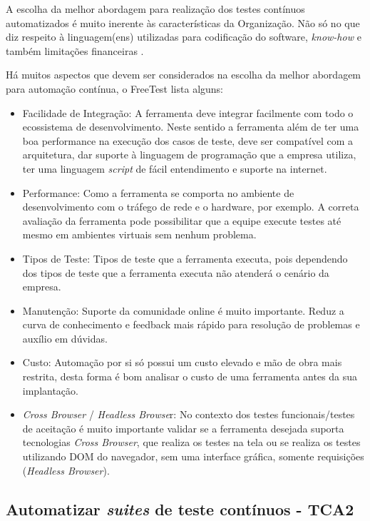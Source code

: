 A escolha da melhor abordagem para realização dos testes contínuos automatizados é muito inerente às características da Organização. Não só no que diz respeito à linguagem(ens) utilizadas para codificação do software, \textit{know-how} e também limitações financeiras \cite{Castelo2015}.

Há muitos aspectos que devem ser considerados na escolha da melhor abordagem para automação contínua, o FreeTest lista alguns:

\begin{itemize}
	\item Facilidade de Integração: A ferramenta deve integrar facilmente com todo o ecossistema de desenvolvimento. Neste sentido a ferramenta além de ter uma boa performance na execução dos casos de teste, deve ser compatível com a arquitetura, dar suporte à linguagem de programação que a empresa utiliza, ter uma linguagem \textit{script} de fácil entendimento e suporte na internet.
	\item Performance: Como a ferramenta se comporta no ambiente de desenvolvimento com o tráfego de rede e o hardware, por exemplo. A correta avaliação da ferramenta pode possibilitar que a equipe execute testes até mesmo em ambientes virtuais sem nenhum problema.
	\item Tipos de Teste: Tipos de teste que a ferramenta executa, pois dependendo dos tipos de teste que a ferramenta executa não atenderá o cenário da empresa.
	\item Manutenção: Suporte da comunidade online é muito importante. Reduz a curva de conhecimento e feedback mais rápido para resolução de problemas e auxílio em dúvidas.
	\item Custo: Automação por si só possui um custo elevado e mão de obra mais restrita, desta forma é bom analisar o custo de uma ferramenta antes da sua implantação.
	\item \textit{Cross Browser} / \textit{Headless Browse}r: No contexto dos testes funcionais/testes de aceitação é muito importante validar se a ferramenta desejada suporta tecnologias \textit{Cross Browser}, que realiza os testes na tela ou se realiza os testes utilizando DOM do navegador, sem uma interface gráfica, somente requisições (\textit{Headless Browser}).
\end{itemize}


\subsection{Automatizar \textit{suites} de teste contínuos - TCA2}
\label{sec:guiatca2}

